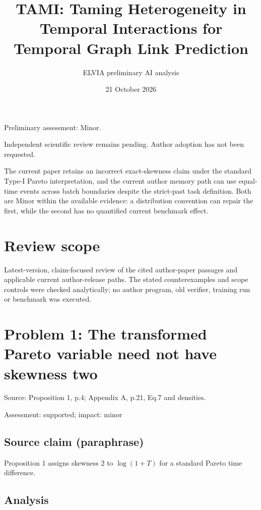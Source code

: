 \documentclass[11pt]{article}
\begin{document}
\title{TAMI: Taming Heterogeneity in Temporal Interactions for Temporal Graph Link Prediction}

\author{ELVIA preliminary AI analysis}\date{21 October 2026}\maketitle

Preliminary assessment: Minor.\par

Independent scientific review remains pending. Author adoption has not been requested.

The current paper retains an incorrect exact-skewness claim under the standard Type-I Pareto interpretation, and the current author memory path can use equal-time events across batch boundaries despite the strict-past task definition. Both are Minor within the available evidence: a distribution convention can repair the first, while the second has no quantified current benchmark effect.

\section*{Review scope}

Latest-version, claim-focused review of the cited author-paper passages and applicable current author-release paths. The stated counterexamples and scope controls were checked analytically; no author program, old verifier, training run or benchmark was executed.

\section*{Problem 1: The transformed Pareto variable need not have skewness two}

Source: Proposition 1, p.4; Appendix A, p.21, Eq.7 and densities.

Assessment: supported; impact: minor

\subsection*{Source claim (paraphrase)}

Proposition 1 assigns skewness \(2\) to \(\log(1+T)\) for a standard Pareto time difference.

\subsection*{Analysis}
\end{document}
